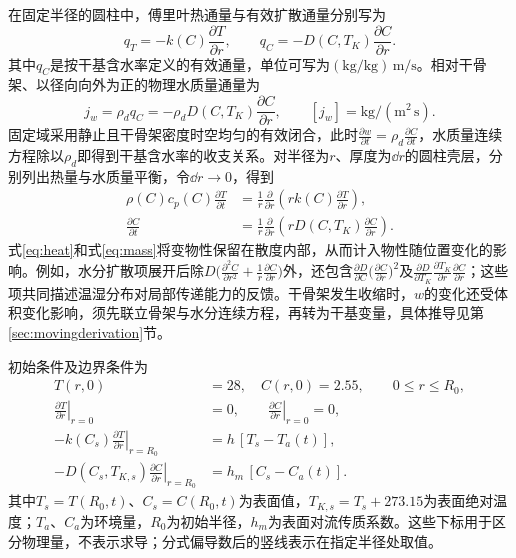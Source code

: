在固定半径的圆柱中，傅里叶热通量与有效扩散通量分别写为\cite{heat,nht}
\begin{equation}
q_T=-k(C)\frac{\partial T}{\partial r},\qquad
q_C=-D(C,T_K)\frac{\partial C}{\partial r}.
\end{equation}
其中$q_C$是按干基含水率定义的有效通量，单位可写为$(\mathrm{kg/kg})\,\mathrm{m/s}$。相对干骨架、以径向向外为正的物理水质量通量为
\begin{equation}
j_w=\rho_dq_C=-\rho_dD(C,T_K)\frac{\partial C}{\partial r},\qquad
[j_w]=\mathrm{kg/(m^2\,s)}.
\label{eq:physicalwaterflux}
\end{equation}
固定域采用静止且干骨架密度时空均匀的有效闭合，此时$\frac{\partial w}{\partial t}=\rho_d\frac{\partial C}{\partial t}$，水质量连续方程除以$\rho_d$即得到干基含水率的收支关系。对半径为$r$、厚度为$\dd r$的圆柱壳层，分别列出热量与水质量平衡，令$\dd r\to0$，得到
\begin{align}
\rho(C)c_p(C)\frac{\partial T}{\partial t}
&=\frac1r\frac{\partial}{\partial r}\left(rk(C)\frac{\partial T}{\partial r}\right),\label{eq:heat}\\
\frac{\partial C}{\partial t}
&=\frac1r\frac{\partial}{\partial r}\left(rD(C,T_K)\frac{\partial C}{\partial r}\right).
\label{eq:mass}
\end{align}
式\eqref{eq:heat}和式\eqref{eq:mass}将变物性保留在散度内部，从而计入物性随位置变化的影响。例如，水分扩散项展开后除$D\bigl(\frac{\partial^2 C}{\partial r^2}+\frac1r\frac{\partial C}{\partial r}\bigr)$外，还包含$\frac{\partial D}{\partial C}\bigl(\frac{\partial C}{\partial r}\bigr)^2$及$\frac{\partial D}{\partial T_K}\frac{\partial T_K}{\partial r}\frac{\partial C}{\partial r}$；这些项共同描述温湿分布对局部传递能力的反馈。干骨架发生收缩时，$w$的变化还受体积变化影响，须先联立骨架与水分连续方程，再转为干基变量，具体推导见第\ref{sec:movingderivation}节。

初始条件及边界条件为
\begin{align}
T(r,0)&=28,\quad C(r,0)=2.55,\qquad 0\le r\le R_0,\label{eq:initial}\\
\left.\frac{\partial T}{\partial r}\right|_{r=0}&=0,\qquad \left.\frac{\partial C}{\partial r}\right|_{r=0}=0,\label{eq:center}\\
-k(C_s)\left.\frac{\partial T}{\partial r}\right|_{r=R_0}&=h\,[T_s-T_a(t)],\label{eq:bcT}\\
-D(C_s,T_{K,s})\left.\frac{\partial C}{\partial r}\right|_{r=R_0}&=h_m\,[C_s-C_a(t)].\label{eq:bcC}
\end{align}
其中$T_s=T(R_0,t)$、$C_s=C(R_0,t)$为表面值，$T_{K,s}=T_s+273.15$为表面绝对温度；$T_a$、$C_a$为环境量，$R_0$为初始半径，$h_m$为表面对流传质系数。这些下标用于区分物理量，不表示求导；分式偏导数后的竖线表示在指定半径处取值。

